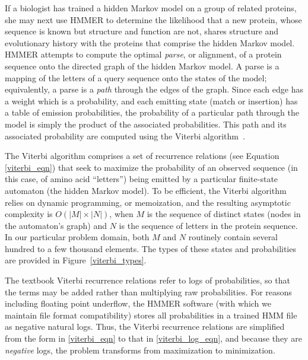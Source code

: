 \documentclass[preprint]{sigplanconf}
\begin{document}
If a biologist has trained a hidden Markov model on a group of related 
proteins, she may next use HMMER to determine the likelihood that a new 
protein, whose sequence is known but structure and function are not, shares 
structure and evolutionary history with the proteins that comprise the hidden 
Markov model. HMMER attempts to compute the optimal \textit{parse}, or 
alignment, of a protein sequence onto the directed graph of the hidden Markov 
model. A parse is a mapping of the letters of a query sequence onto the states 
of the model; equivalently, a parse is a \textit{path} through the edges of the 
graph. Since each edge has a weight which is a probability, and each emitting 
state (match or insertion) has a table of emission probabilities, the 
probability of a particular path through the model is simply the product of the 
associated probabilities. This path and its associated probability are computed 
using the Viterbi algorithm~\cite{Viterbi:1967}.


The Viterbi algorithm comprises a set of recurrence 
relations (see Equation \ref{viterbi_eqn}) that seek to maximize the 
probability of an observed sequence (in this case, of amino acid ``letters'') 
being emitted by a particular finite-state automaton (the hidden Markov model). 
To be efficient, the Viterbi 
algorithm relies on dynamic programming, or memoization, and the resulting 
asymptotic complexity is $O(|M|\times|N|)$, when $M$ is the sequence of 
distinct states (nodes in the automaton's graph) and $N$ is the sequence of 
letters in the protein sequence. In our particular problem domain, both $M$ and 
$N$ routinely contain several hundred to a few thousand elements. The types of 
these states and probabilities are provided in Figure~\ref{viterbi_types}.


\begin{figure}

\end{figure}


The textbook Viterbi recurrence relations refer to logs of probabilities, so 
that the terms may be added rather than multiplying raw probabilities. For 
reasons including floating point underflow, the HMMER software (with which we 
maintain file format compatibility) stores all probabilities in a trained HMM 
file as negative natural logs. Thus, the Viterbi recurrence relations are 
simplified from the form in \ref{viterbi_eqn} to that in \ref{viterbi_log_eqn}, 
and because they are \textit{negative} logs, the problem transforms from 
maximization to minimization.
\end{document}
